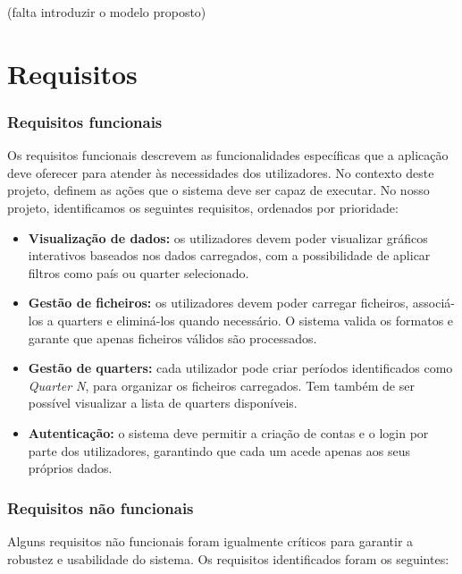 (falta introduzir o modelo proposto)


\section{Requisitos}
\label{sec:requisitos}

\subsubsection{Requisitos funcionais}
Os requisitos funcionais descrevem as funcionalidades específicas que a aplicação deve oferecer para atender às necessidades dos utilizadores. No contexto deste projeto, definem as ações que o sistema deve ser capaz de executar. No nosso projeto, identificamos os seguintes requisitos, ordenados por prioridade:

\begin{itemize}
    \item \textbf{Visualização de dados:} os utilizadores devem poder visualizar gráficos interativos baseados nos dados carregados, com a possibilidade de aplicar filtros como país ou quarter selecionado.

    \item \textbf{Gestão de ficheiros:} os utilizadores devem poder carregar ficheiros, associá-los a quarters e eliminá-los quando necessário. O sistema valida os formatos e garante que apenas ficheiros válidos são processados.
    
    \item \textbf{Gestão de quarters:} cada utilizador pode criar períodos identificados como \textit{Quarter N}, para organizar os ficheiros carregados. Tem também de ser possível visualizar a lista de quarters disponíveis.

    \item \textbf{Autenticação:} o sistema deve permitir a criação de contas e o login por parte dos utilizadores, garantindo que cada um acede apenas aos seus próprios dados.
    
\end{itemize}

\subsubsection{Requisitos não funcionais}

Alguns requisitos não funcionais foram igualmente críticos para garantir a robustez e usabilidade do sistema. Os requisitos identificados foram os seguintes:


